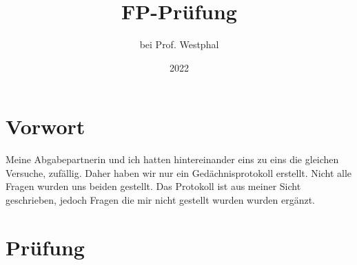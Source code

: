 \documentclass[
  bibliography=totoc,     %
  captions=tableheading,  %
  titlepage=firstiscover, %
]{scrartcl}
\title{FP-Prüfung}
\subtitle{bei Prof. Westphal}
\date{%
  2022
}
\begin{document}
\maketitle
\tableofcontents
\newpage

\section{Vorwort}
Meine Abgabepartnerin und ich hatten hintereinander eins zu eins die gleichen Versuche, zufällig. Daher 
haben wir nur ein Gedächnisprotokoll erstellt. Nicht alle Fragen wurden uns beiden gestellt. Das Protokoll ist aus meiner Sicht geschrieben, jedoch 
Fragen die mir nicht gestellt wurden wurden ergänzt.

\section{Prüfung}
\end{document}
